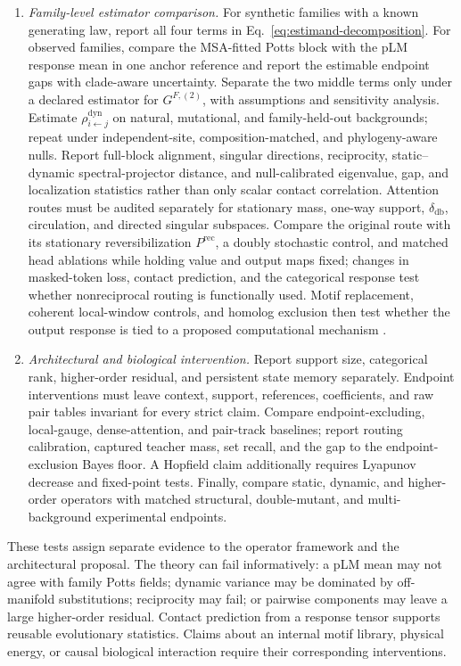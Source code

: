 \documentclass[10pt]{article}
\theoremstyle{definition}
\theoremstyle{remark}
\begin{document}
\begin{enumerate}
\item \emph{Family-level estimator comparison.}  For synthetic families with a known generating
law, report all four terms in Eq.~\ref{eq:estimand-decomposition}.  For observed families, compare
the MSA-fitted Potts block with the pLM response mean in one anchor reference and report the
estimable endpoint gaps with clade-aware uncertainty.  Separate the two middle terms only under a
declared estimator for $G^{F,(2)}$, with assumptions and sensitivity analysis.  Estimate
$\rho_{i\leftarrow j}^{\mathrm{dyn}}$ on natural, mutational, and family-held-out backgrounds; repeat under
independent-site, composition-matched, and phylogeny-aware nulls.  Report full-block alignment,
singular directions, reciprocity, static--dynamic spectral-projector distance, and null-calibrated
eigenvalue, gap, and localization statistics rather than only scalar contact correlation.  Attention
routes must be audited separately for stationary mass, one-way support,
$\delta_{\mathrm{db}}$, circulation, and directed singular subspaces.  Compare the original route
with its stationary reversibilization $P^{\mathrm{rec}}$, a doubly stochastic control, and matched
head ablations while holding value and output maps fixed; changes in masked-token loss, contact
prediction, and the categorical response test whether nonreciprocal routing is functionally used.
Motif replacement, coherent local-window controls, and homolog exclusion then test whether the
output response is tied to a proposed computational mechanism \cite{zhang2024motifs}.

\item \emph{Architectural and biological intervention.}  Report support size, categorical rank,
higher-order residual, and persistent state memory separately.  Endpoint interventions must leave
context, support, references, coefficients, and raw pair tables invariant for every strict claim.
Compare endpoint-excluding, local-gauge, dense-attention, and pair-track baselines; report routing
calibration, captured teacher mass, set recall, and the gap to the endpoint-exclusion Bayes floor.  A Hopfield
claim additionally requires Lyapunov decrease and fixed-point tests.  Finally, compare static,
dynamic, and higher-order operators with matched structural, double-mutant, and multi-background
experimental endpoints.
\end{enumerate}

These tests assign separate evidence to the operator framework and the architectural proposal.  The
theory can fail informatively: a pLM mean may not agree with family Potts fields; dynamic variance may be
dominated by off-manifold substitutions; reciprocity may fail; or pairwise components may leave a
large higher-order residual.  Contact prediction from a response tensor supports reusable
evolutionary statistics.  Claims about an internal motif library, physical energy, or causal
biological interaction require their corresponding interventions.
\fi
\end{document}
